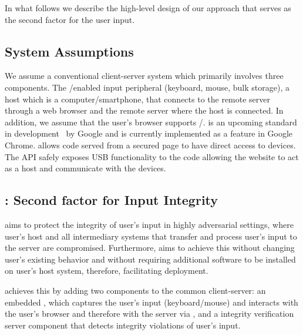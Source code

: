 In what follows we describe the high-level design of our approach \name that serves as the second factor for the user input. 

\subsection{System Assumptions} 
\label{sec:inputPrivacy:systemModel}

We assume a conventional client-server system which primarily involves three components. The \usb/\bluetooth enabled input peripheral (keyboard, mouse, bulk storage), a host which is a computer/smartphone, that connects to the remote server through a web browser and the remote server where the host is connected. In addition, we assume that the user's browser supports \webusb/\webbt. \webusb is an upcoming standard in development~\cite{webusb} by Google and is currently implemented as a feature in Google Chrome. \webusb allows \js code served from a \https secured page to have direct access to \usb devices. The \webusb API safely exposes USB functionality to the \js code allowing the website to act as a \usb host and communicate with the \usb devices.


\subsection{\name: Second factor for Input Integrity}
\name aims to protect the integrity of user's input in highly adversarial settings, where user's host and all intermediary systems that transfer and process user's input to the server are compromised. Furthermore, \name aims to achieve this without changing user's existing behavior and without requiring additional software to be installed on user's host system, therefore, facilitating deployment. 

\name{} achieves this by adding two components to the common client-server: an embedded \device, which captures the user's input (keyboard/mouse) and interacts with the user's browser and therefore with the server via \webusb, and a \name integrity verification server component that detects integrity violations of user's input. 

